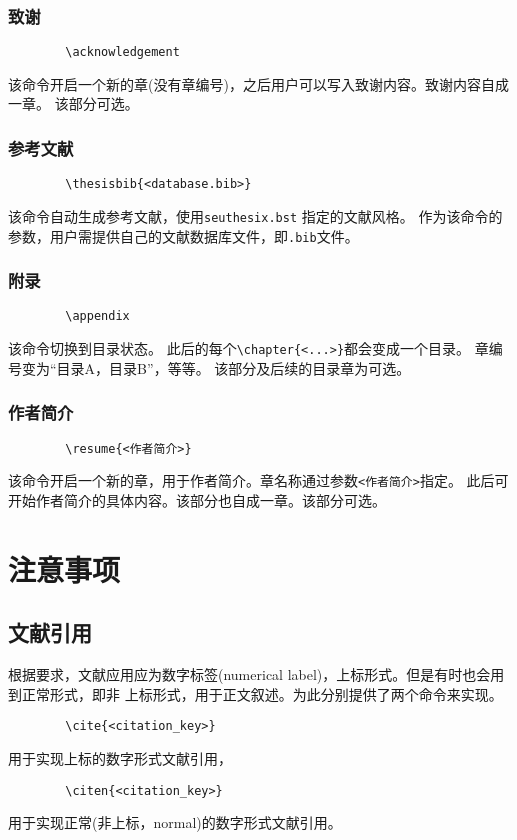 \documentclass[figurelist,tablelist,algorithmlist,nomlist,masters]{seuthesix}
\begin{document}
	\subsection{致谢}
	{\color{magenta}
		\begin{verbatim}
		\acknowledgement
		\end{verbatim}
	}
	该命令开启一个新的章(没有章编号)，之后用户可以写入致谢内容。致谢内容自成一章。
	该部分可选。
	\subsection{参考文献}
	{\color{magenta}
		\begin{verbatim}
		\thesisbib{<database.bib>}
		\end{verbatim}
	}
	该命令自动生成参考文献，使用\texttt{seuthesix.bst} 指定的文献风格。
	作为该命令的参数，用户需提供自己的文献数据库文件，即\texttt{.bib}文件。

	\subsection{附录}
	{\color{magenta}
		\begin{verbatim}
		\appendix
		\end{verbatim}
	}
	该命令切换到目录状态。
	此后的每个\verb+\chapter{<...>}+都会变成一个目录。
	章编号变为“目录A，目录B”，等等。
	该部分及后续的目录章为可选。
	\subsection{作者简介}
	{\color{magenta}
		\begin{verbatim}
		\resume{<作者简介>}
		\end{verbatim}
	}
	该命令开启一个新的章，用于作者简介。章名称通过参数\texttt{<作者简介>}指定。
	此后可开始作者简介的具体内容。该部分也自成一章。该部分可选。


	\chapter{注意事项}
	\section{文献引用}
	根据要求，文献应用应为数字标签(numerical label)，上标形式。但是有时也会用到正常形式，即非
	上标形式，用于正文叙述。为此分别提供了两个命令来实现。
	{\color{magenta}
		\begin{verbatim}
		\cite{<citation_key>}
		\end{verbatim}
	}
	用于实现上标的数字形式文献引用\cite{knuth}，
	{\color{magenta}
		\begin{verbatim}
		\citen{<citation_key>}
		\end{verbatim}
	}
	用于实现正常(非上标，normal)的数字形式文献引用。
\end{document}
